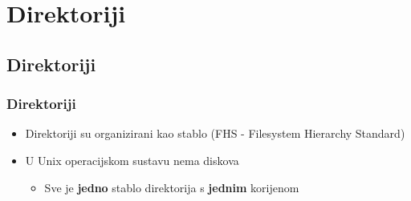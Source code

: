 \documentclass{beamer}
\begin{document}
\section{Direktoriji}
\subsection{Direktoriji}
\begin{frame}[t]
\frametitle{Direktoriji}
  \begin{itemize}
    \item Direktoriji su organizirani kao stablo (FHS - Filesystem Hierarchy Standard)
    \item U Unix operacijskom sustavu nema diskova
    \begin{itemize}
      \item Sve je \textbf{jedno} stablo direktorija s \textbf{jednim} 
            korijenom
    \end{itemize}
    \centering
  \end{itemize}
\end{frame}
\end{document}

